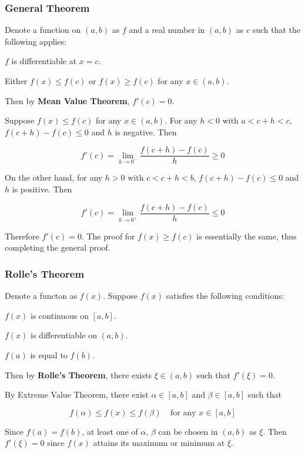 \documentclass[a4paper,12pt]{article}
\begin{document}
\subsubsection{General Theorem}
\begin{thm}
  Denote a function on $(a,b)$ as $f$ and a real number in $(a,b)$ as $c$ such that the following applies:

  \begin{alist}
    \item $f$ is differentiable at $x=c$.
    \item Either $f(x)\leq f(c)$ or $f(x)\geq f(c)$ for any $x\in (a,b)$.
  \end{alist}

  Then by \textbf{Mean Value Theorem}, $f'(c)=0$.\n

  \prf Suppose $f(x)\leq f(c)$ for any $x\in (a,b)$. For any $h<0$ with $a<c+h<c$, $f(c+h)-f(c)\leq 0$ and $h$ is negative. Then

  $$f'(c)=\lim_{h\to 0^{-}}\frac{f(c+h)-f(c)}{h}\geq 0$$\s

  On the other hand, for any $h>0$ with $c<c+h<b$, $f(c+h)-f(c)\leq 0$ and $h$ is positive. Then

  $$f'(c)=\lim_{h\to 0^{+}}\frac{f(c+h)-f(c)}{h}\leq 0$$\s

  Therefore $f'(c)=0$. The proof for $f(x)\geq f(c)$ is essentially the same, thus completing the general proof.
\end{thm}

\subsubsection{Rolle's Theorem}
\begin{thm}
  Denote a functon as $f(x)$. Suppose $f(x)$ satisfies the following conditions:

  \begin{alist}
    \item $f(x)$ is continuous on $[a,b]$.
    \item $f(x)$ is differentiable on $(a,b)$.
    \item $f(a)$ is equal to $f(b)$.
  \end{alist}

  Then by \textbf{Rolle's Theorem}, there exists $\xi\in (a,b)$ such that $f'(\xi)=0$.\n

  \prf By Extreme Value Theorem, there exist $\alpha\in [a,b]$ and $\beta\in [a,b]$ such that

  $$f(\alpha)\leq f(x)\leq f(\beta)\;\;\;\;\text{for any }x\in [a,b]$$\s

  Since $f(a)=f(b)$, at least one of $\alpha$, $\beta$ can be chosen in $(a,b)$ as $\xi$. Then $f'(\xi)=0$ since $f(x)$ attains its maximum or minimum at $\xi$.
\end{thm}
\end{document}
